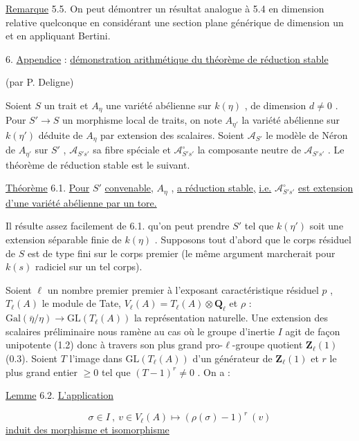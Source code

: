 \underline{Remarque} 5.5. On peut démontrer un résultat analogue à 5.4 en dimension relative quelconque en considérant une section plane générique de dimension un et en appliquant Bertini.


6. \underline{Appendice} : \underline{démonstration arithmétique du théorème de réduction stable}

(par P. Deligne)

Soient $S$ un trait et $A_\eta$ une variété abélienne sur $k(\eta)$ , de dimension $d \neq 0$ . Pour $S' \longrightarrow S$ un morphisme local de traits, on note $A_{\eta'}$ la variété abélienne sur $k(\eta')$ déduite de $A_\eta$ par extension des scalaires. Soient $\mathcal{A}_{S'}$ le modèle de Néron de $A_{\eta'}$ sur $S'$ , $\mathcal{A}_{S's'}$ sa fibre spéciale et $\mathcal{A}^{\circ}_{S's'}$ la composante neutre de $\mathcal{A}_{S's'}$ . Le théorème de réduction stable est le suivant.


\underline{Théorème} 6.1. \underline{Pour} $S'$ \underline{convenable,} $A_{\eta}$ , \underline{a réduction stable,} \underline{i.e.} $\mathcal{A}^{\circ}_{S's'}$ \underline{est extension d'une variété abélienne par un tore.}

Il résulte assez facilement de 6.1. qu'on peut prendre $S'$ tel que $k(\eta')$ soit une extension séparable finie de $k(\eta)$ . Supposons tout d'abord que le corps résiduel de $S$ est de type fini sur le corps premier (le même argument marcherait pour $k(s)$ radiciel sur un tel corps).

Soient $\ell$ un nombre premier premier à l'exposant caractéristique résiduel $p$ , $T_{\ell}(A)$ le module de Tate, $V_{\ell}(A) = T_{\ell}(A) \otimes \mathbf{Q}_{\ell}$ et $\rho$ : $\mathrm{Gal}(\bar{\eta}/\eta) \longrightarrow \mathrm{GL}(T_{\ell}(A))$ la représentation naturelle. Une extension des scalaires préliminaire  nous ramène au cas où le groupe d'inertie $I$ agit de façon unipotente (1.2) donc à travers son plus grand pro-$\ell$-groupe quotient $\mathbf{Z}_{\ell}(1)$ (0.3). Soient $T$ l'image dans $\mathrm{GL}(T_{\ell}(A))$ d'un générateur de $\mathbf{Z}_{\ell}(1)$ et $r$ le plus grand entier $\geqslant 0$ tel que $(T-1)^{r} \neq 0$ . On a :

\underline{Lemme} 6.2. \underline{L'application}

\begin{equation*}
\sigma \in I \ , \ v \in V_{\ell}(A) \longmapsto (\rho(\sigma)-1)^{r} \ (v)
\end{equation*}
\underline{induit des morphisme et isomorphisme}

